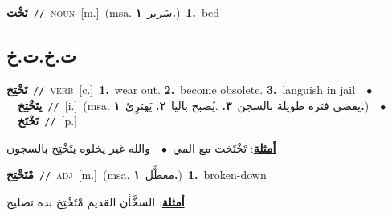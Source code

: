 \documentclass[10pt,a4paper,twoside]{article} %
\begin{document}
\begin{multicols}{2}
{{{\setlength\topsep{0pt}\textbf{\foreignlanguage{arabic}{تَخْت}}\ {\color{gray}\texttt{//}\color{black}}\ \textsc{noun}\ [m.]\ \color{gray}(msa. \foreignlanguage{arabic}{سَرير}~\foreignlanguage{arabic}{\textbf{١.}})\color{black}\ \textbf{1.}~bed\ 

\vspace{-3mm}
\subsection*{\color{blue}\foreignlanguage{arabic}{ت.خ.ت.خ}\color{blue}{}} 

{\setlength\topsep{0pt}\textbf{\foreignlanguage{arabic}{تَخْتِخ}}\ {\color{gray}\texttt{//}\color{black}}\ \textsc{verb}\ [c.]\ \textbf{1.}~wear out.  \textbf{2.}~become obsolete.  \textbf{3.}~languish in jail\ \ $\bullet$\ \ \setlength\topsep{0pt}\textbf{\foreignlanguage{arabic}{يتَخْتِخ}}\ {\color{gray}\texttt{//}\color{black}}\ [i.]\ \color{gray}(msa. \foreignlanguage{arabic}{يقضي فترة طويلة بالسجن}~\foreignlanguage{arabic}{\textbf{٣.}}  .\foreignlanguage{arabic}{يُصبح باليا}~\foreignlanguage{arabic}{\textbf{٢.}}  \foreignlanguage{arabic}{يَهترِئ}~\foreignlanguage{arabic}{\textbf{١.}})\color{black}\ \ $\bullet$\ \ \setlength\topsep{0pt}\textbf{\foreignlanguage{arabic}{تَخْتَخ}}\ {\color{gray}\texttt{//}\color{black}}\ [p.]\  \begin{flushright}\color{gray}\foreignlanguage{arabic}{\textbf{\underline{\foreignlanguage{arabic}{أمثلة}}}: تَخْتَخت مع المي\ $\bullet$\ \  والله غير يخلوه يتَخْتِخ بالسجون}\end{flushright}\color{black}} \vspace{2mm}

{\setlength\topsep{0pt}\textbf{\foreignlanguage{arabic}{مْتَخْتِخ}}\ {\color{gray}\texttt{//}\color{black}}\ \textsc{adj}\ [m.]\ \color{gray}(msa. \foreignlanguage{arabic}{معطَّل}~\foreignlanguage{arabic}{\textbf{١.}})\color{black}\ \textbf{1.}~broken-down\  \begin{flushright}\color{gray}\foreignlanguage{arabic}{\textbf{\underline{\foreignlanguage{arabic}{أمثلة}}}: السخَّأن القديم مْتَخْتِخ بده تصليح}\end{flushright}\color{black}} \vspace{2mm}

}}}
\end{multicols}
\end{document}

